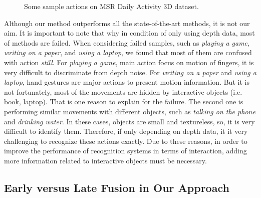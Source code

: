 \documentclass[review]{elsarticle}
\begin{document}
\begin{figure}
{        }
    \hfill
	\caption{\label{lbl:Figure_MSRDaily3D}Some sample actions on MSR Daily Activity 3D dataset.}
\end{figure}

Although our method outperforms all the state-of-the-art methods, it is not our aim. It is important to note that why in condition of only using depth data, most of methods are failed. When considering failed samples, such as \textit{playing a game}, \textit{writing on a paper}, and \textit{using a laptop}, we found that most of them are confused with action \textit{still}. For \textit{playing a game}, main action focus on motion of fingers, it is very difficult to discriminate from depth noise. For \textit{writing on a paper} and \textit{using a laptop}, hand gestures are major actions to present motion information. But it is not fortunately, most of the movements are hidden by interactive objects (i.e. book, laptop). That is one reason to explain for the failure. The second one is performing similar movements with different objects, such as \textit{talking on the phone} and \textit{drinking water}. In these cases, objects are small and textureless, so, it is very difficult to identify them.  Therefore, if only depending on depth data, it it very challenging to recognize these actions exactly. Due to these reasons, in order to improve the performance of recognition systems in terms of interaction, adding more information related to interactive objects must be necessary.

\subsection{Early versus Late Fusion in Our Approach}
\end{document}
